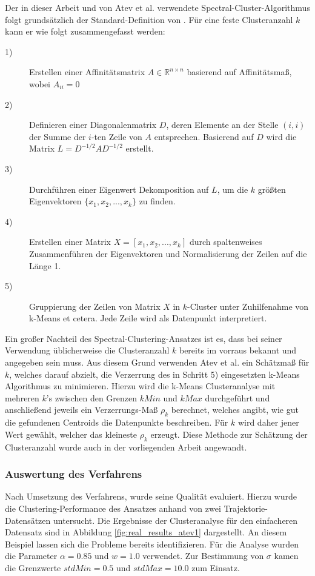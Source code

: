 Der in dieser Arbeit und von Atev et al. verwendete Spectral-Cluster-Algorithmus folgt grundsätzlich
der Standard-Definition von \cite[]{Ng2002}.
Für eine feste Clusteranzahl $k$ kann er wie folgt zusammengefasst werden:

\begin{description}
    \item[1)] Erstellen einer Affinitätsmatrix $A \in \mathbb{R}^{n \times n}$ basierend auf Affinitätsmaß, wobei $A_{ii} = 0$
    \item[2)] Definieren einer Diagonalenmatrix $D$, deren Elemente an der Stelle $(i,i)$ der Summe der $i$-ten
            Zeile von $A$ entsprechen. Basierend auf $D$ wird die Matrix $L = D^{-1/2} AD^{-1/2}$ erstellt.
    \item[3)] Durchführen einer Eigenwert Dekomposition auf $L$, um die $k$ größten Eigenvektoren
            $\{x_1, x_2, ..., x_k\}$ zu finden.
    \item[4)] Erstellen einer Matrix $X = [x_1, x_2,..., x_k]$ durch spaltenweises Zusammenführen der Eigenvektoren und
            Normalisierung der Zeilen auf die Länge 1.
    \item[5)] Gruppierung der Zeilen von Matrix $X$ in $k$-Cluster unter Zuhilfenahme von k-Means et cetera.
            Jede Zeile wird als Datenpunkt interpretiert.
\end{description}

Ein großer Nachteil des Spectral-Clustering-Ansatzes ist es, dass bei seiner Verwendung üblicherweise die Clusteranzahl $k$
bereits im vorraus bekannt und angegeben sein muss. Aus diesem Grund verwenden Atev et al. ein Schätzmaß für
$k$, welches darauf abzielt, die Verzerrung des in Schritt 5) eingesetzten k-Means Algorithmus zu minimieren.
Hierzu wird die k-Means Clusteranalyse mit mehreren $k$'s zwischen den Grenzen $kMin$ und $kMax$ durchgeführt
und anschließend jeweils ein Verzerrungs-Maß $\rho_k$ berechnet, welches angibt, wie gut die gefundenen Centroids
die Datenpunkte beschreiben. Für $k$ wird daher jener Wert gewählt, welcher das
kleineste $\rho_k$ erzeugt. Diese Methode zur Schätzung der Clusteranzahl wurde auch in der vorliegenden
Arbeit angewandt.

\subsubsection{Auswertung des Verfahrens}

Nach Umsetzung des Verfahrens, wurde seine Qualität evaluiert. Hierzu wurde die Clustering-Performance des Ansatzes
anhand von zwei Trajektorie-Datensätzen untersucht.
Die Ergebnisse der Clusteranalyse für den einfacheren Datensatz sind in Abbildung \ref{fig:real_results_atev1}
dargestellt. An diesem Beispiel lassen sich die Probleme bereits identifizieren.
Für die Analyse wurden die Parameter $\alpha = 0.85$ und $w = 1.0$ verwendet.
Zur Bestimmung von $\sigma$ kamen die Grenzwerte $stdMin = 0.5$ und $stdMax = 10.0$ zum Einsatz.

